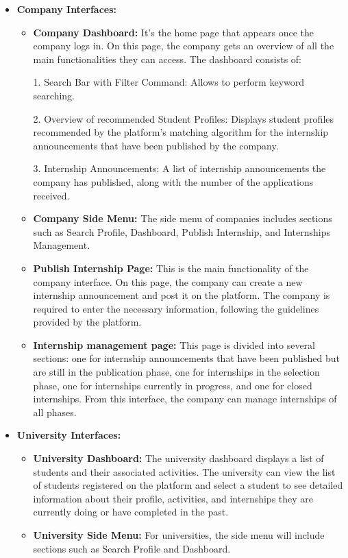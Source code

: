 \begin{itemize}
\begin{itemize}
    \end{itemize}
    \item \textbf{Company Interfaces:} 
    \begin{itemize}
        \item \textbf{Company Dashboard:} It's the home page that appears once the company logs in. On this page, the company gets an overview of 
        all the main functionalities they can access. The dashboard consists of:

        1. Search Bar with Filter Command: Allows to perform keyword searching.
        
        2. Overview of recommended Student Profiles: Displays student profiles recommended by the platform's matching algorithm for the internship 
        announcements that have been published by the company.
        
        3. Internship Announcements: A list of internship announcements the company has published, along with the number of the applications
        received.

        \item \textbf{Company Side Menu:} The side menu of companies includes sections such as Search Profile, Dashboard, Publish Internship,
        and Internships Management.
        
       \item \textbf{Publish Internship Page:} This is the main functionality of the company interface. On this page, the company can 
       create a new internship announcement and post it on the platform. The company is required to enter the necessary information, 
       following the guidelines provided by the platform.

        \item \textbf{Internship management page:} This page is divided into several sections: one for internship announcements that have 
        been published but are still in the publication phase, one for internships in the selection phase, one for internships currently 
        in progress, and one for closed internships. From this interface, the company can manage internships of all phases.
    \end{itemize}

    \item \textbf{University Interfaces:} 
    \begin{itemize}
        \item \textbf{University Dashboard:} The university dashboard displays a list of students and their associated activities. 
        The university can view the list of students registered on the platform and select a student to see detailed information about 
        their profile, activities, and internships they are currently doing or have completed in the past.

        \item \textbf{University Side Menu:} For universities, the side menu will include sections such as Search Profile and Dashboard.
    \end{itemize}
\end{itemize}



